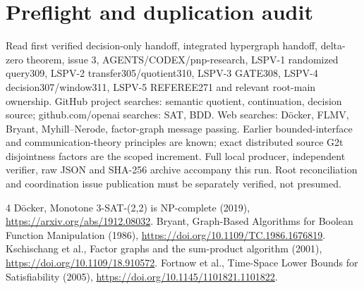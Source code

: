 \documentclass[11pt]{article}
\begin{document}
\section{Preflight and duplication audit}
Read first verified decision-only handoff, integrated hypergraph handoff, delta-zero theorem, issue 3, AGENTS/CODEX/pnp-research, LSPV-1 randomized query309, LSPV-2 transfer305/quotient310, LSPV-3 GATE308, LSPV-4 decision307/window311, LSPV-5 REFEREE271 and relevant root-main ownership. GitHub project searches: semantic quotient, continuation, decision source; github.com/openai searches: SAT, BDD. Web searches: D\"ocker, FLMV, Bryant, Myhill--Nerode, factor-graph message passing. Earlier bounded-interface and communication-theory principles are known; exact distributed source G2t disjointness factors are the scoped increment. Full local producer, independent verifier, raw JSON and SHA-256 archive accompany this run. Root reconciliation and coordination issue publication must be separately verified, not presumed.
\begin{thebibliography}{4}
 D\"ocker, Monotone 3-SAT-(2,2) is NP-complete (2019), \url{https://arxiv.org/abs/1912.08032}.
 Bryant, Graph-Based Algorithms for Boolean Function Manipulation (1986), \url{https://doi.org/10.1109/TC.1986.1676819}.
 Kschischang et al., Factor graphs and the sum-product algorithm (2001), \url{https://doi.org/10.1109/18.910572}.
 Fortnow et al., Time-Space Lower Bounds for Satisfiability (2005), \url{https://doi.org/10.1145/1101821.1101822}.
\end{thebibliography}
\end{document}
